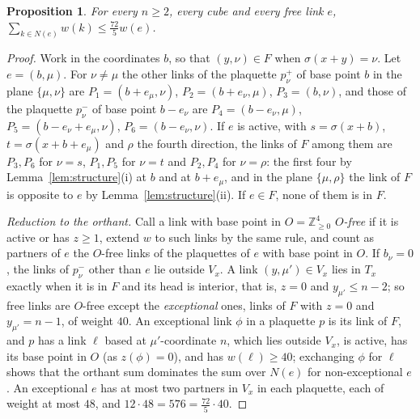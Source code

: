 \documentclass[11pt]{amsart}
\newtheorem{proposition}[theorem]{Proposition}
\theoremstyle{definition}
\theoremstyle{remark}
\numberwithin{equation}{section}
\newcommand{\Z}{\mathbb{Z}}
\begin{document}
\begin{proposition}\label{prop:weights}
For every $n\ge2$, every cube and every free link $e$,
$\sum_{k\in N(e)}w(k)\le\frac{72}5w(e)$.
\end{proposition}

\begin{proof}
Work in the coordinates $b$, so that $(y,\nu)\in F$ when $\sigma(x+y)=\nu$.
Let $e=(b,\mu)$. For $\nu\ne\mu$ the other links of the plaquette $p^+_\nu$ of
base point $b$ in the plane $\{\mu,\nu\}$ are $P_1=(b+e_\mu,\nu)$,
$P_2=(b+e_\nu,\mu)$, $P_3=(b,\nu)$, and those of the plaquette $p^-_\nu$ of base
point $b-e_\nu$ are $P_4=(b-e_\nu,\mu)$, $P_5=(b-e_\nu+e_\mu,\nu)$,
$P_6=(b-e_\nu,\nu)$. If $e$ is active, with $s=\sigma(x+b)$,
$t=\sigma(x+b+e_\mu)$ and $\rho$ the fourth direction, the links of $F$ among
them are $P_3,P_6$ for $\nu=s$, $P_1,P_5$ for $\nu=t$ and $P_2,P_4$ for
$\nu=\rho$: the first four by Lemma~\ref{lem:structure}(i) at $b$ and at
$b+e_\mu$, and in the plane $\{\mu,\rho\}$ the link of $F$ is opposite to $e$
by Lemma~\ref{lem:structure}(ii). If $e\in F$, none of them is in $F$.

\emph{Reduction to the orthant.} Call a link with base point in
$O=\Z^4_{\ge0}$ \emph{$O$-free} if it is active or has $z\ge1$, extend $w$ to
such links by the same rule, and count as partners of $e$ the $O$-free links
of the plaquettes of $e$ with base point in $O$. If $b_\nu=0$, the links of
$p^-_\nu$ other than $e$ lie outside $V_x$. A link $(y,\mu')\in V_x$ lies in
$T_x$ exactly when it is in $F$ and its head is interior, that is, $z=0$ and
$y_{\mu'}\le n-2$; so free links are $O$-free except the \emph{exceptional}
ones, links of $F$ with $z=0$ and $y_{\mu'}=n-1$, of weight $40$. An
exceptional link $\phi$ in a plaquette $p$ is its link of $F$, and $p$ has a
link $\ell$ based at $\mu'$-coordinate $n$, which lies outside $V_x$, is
active, has its base point in $O$ (as $z(\phi)=0$), and has $w(\ell)\ge40$;
exchanging $\phi$ for $\ell$ shows that the orthant sum dominates the sum over
$N(e)$ for non-exceptional $e$. An exceptional $e$ has at most two partners in
$V_x$ in each plaquette, each of weight at most $48$, and $12\cdot48=576=
\frac{72}5\cdot40$.


\end{proof}
\end{document}
